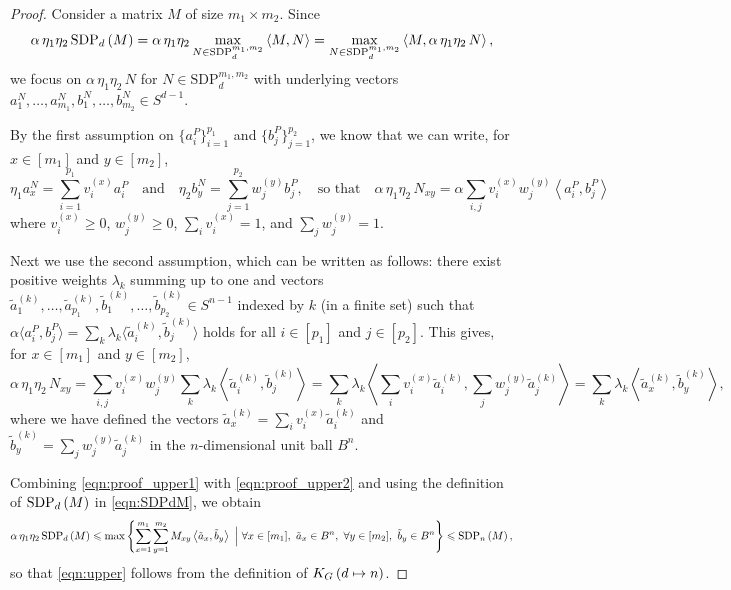 \documentclass[10pt,aps,notitlepage,onecolumn,pra,superscriptaddress]{revtex4-1}
\renewcommand{\leq}{\leqslant}
\renewcommand{\geq}{\geqslant}
\newcommand\cut[2]{\mathrm{SDP}_{#1}^{#2}}
\newcommand{\innp}[2]{\left\langle{#1},{#2}\right\rangle}
\newcommand\KG[2]{K_G\left({#1}\ifx#2\empty\else\mapsto\fi{#2}\right)}
\newcommand\sdp[2]{\mathrm{SDP}_{#1}\ifx#2\empty\else\left({#2}\right)\fi}
\newcommand{\ta}{\tilde{a}}
\newcommand{\tb}{\tilde{b}}
\newcommand{\tinnp}[2]{\langle{#1},{#2}\rangle}
\begin{document}
\begin{proof}
  Consider a matrix $M$ of size $m_1\times m_2$.
  Since
  \begin{equation}
    \alpha\,\eta_1\eta_2\,\sdp{d}{M}=\alpha\,\eta_1\eta_2\max_{N\in\cut{d}{m_1,m_2}}\innp{M}{N}=\max_{N\in\cut{d}{m_1,m_2}}\innp{M}{\alpha\,\eta_1\eta_2\,N},
    \label{eqn:proof_upper1}
  \end{equation}
  we focus on $\alpha\,\eta_1\eta_2\,N$ for $N\in\cut{d}{m_1,m_2}$ with underlying vectors $a_1^N,\ldots,a_{m_1}^N,b_1^N,\ldots,b_{m_2}^N\in S^{d-1}$.

  By the first assumption on $\{a_i^P\}_{i=1}^{p_1}$ and $\{b_j^P\}_{j=1}^{p_2}$, we know that we can write, for $x\in[m_1]$ and $y\in[m_2]$,
  \begin{equation}
    \eta_1a_x^N=\sum_{i=1}^{p_1}v_i^{(x)}a_i^P\quad\text{and}\quad\eta_2b_y^N=\sum_{j=1}^{p_2}w_j^{(y)}b_j^P,\quad\text{so that}\quad\alpha\,\eta_1\eta_2\,N_{xy}=\alpha\sum_{i,j}v_i^{(x)}w_j^{(y)}\innp{a_i^P}{b_j^P}
  \end{equation}
  where $v_i^{(x)}\geq0$, $w_j^{(y)}\geq0$, $\sum_iv_i^{(x)}=1$, and $\sum_jw_j^{(y)}=1$.

  Next we use the second assumption, which can be written as follows: there exist positive weights $\lambda_k$ summing up to one and vectors $\ta_1^{(k)},\ldots,\ta_{p_1}^{(k)},\tb_1^{(k)},\ldots,\tb_{p_2}^{(k)}\in S^{n-1}$ indexed by $k$ (in a finite set) such that $\alpha\tinnp{a_i^P}{b_j^P}=\sum_k\lambda_k\tinnp{\ta_i^{(k)}}{\tb_j^{(k)}}$ holds for all $i\in[p_1]$ and $j\in[p_2]$.
  This gives, for $x\in[m_1]$ and $y\in[m_2]$,
  \begin{equation}
    \alpha\,\eta_1\eta_2\,N_{xy}=\sum_{i,j}v_i^{(x)}w_j^{(y)}\sum_k\lambda_k\innp{\ta_i^{(k)}}{\tb_j^{(k)}}=\sum_k\lambda_k\innp{\sum_iv_i^{(x)}\ta_i^{(k)}}{\sum_jw_j^{(y)}\ta_j^{(k)}}=\sum_k\lambda_k\innp{\ta_x^{(k)}}{\tb_y^{(k)}},
    \label{eqn:proof_upper2}
  \end{equation}
  where we have defined the vectors $\ta_x^{(k)}=\sum_iv_i^{(x)}\ta_i^{(k)}$ and $\tb_y^{(k)}=\sum_jw_j^{(y)}\ta_j^{(k)}$ in the $n$-dimensional unit ball $B^n$.

  Combining \cref{eqn:proof_upper1} with \cref{eqn:proof_upper2} and using the definition of $\sdp{d}{M}$ in \cref{eqn:SDPdM}, we obtain
  \begin{equation}
    \alpha\,\eta_1\eta_2\,\sdp{d}{M}\leq\max\left\{\sum_{x=1}^{m_1}\sum_{y=1}^{m_2} M_{xy}\innp{\ta_x}{\tb_y}~\Big|~\forall x\in[m_1],~\ta_x\in B^n,~\forall y\in[m_2],~\tb_y\in B^n\right\}\leq\sdp{n}{M},
  \end{equation}
  so that \cref{eqn:upper} follows from the definition of $\KG{d}{n}$.
\end{proof}
\end{document}
